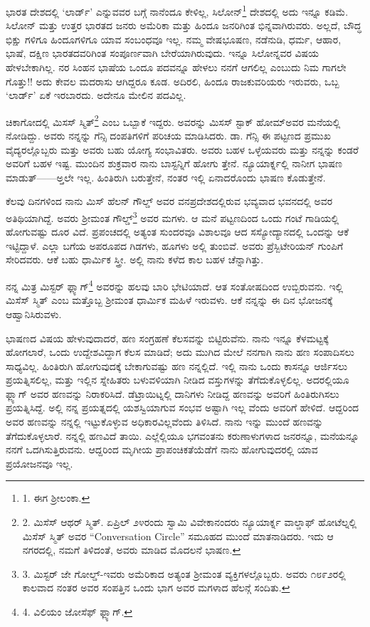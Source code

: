 ಭಾರತ ದೇಶದಲ್ಲಿ ‘ಲಾರ್ಡ್’ ಎನ್ನುವವರ ಬಗ್ಗೆ ನಾನೆಂದೂ ಕೇಳಿಲ್ಲ, ಸಿಲೋನ್\footnote{1. ಈಗ ಶ‍್ರೀಲಂಕಾ.} ದೇಶದಲ್ಲಿ ಅದು ಇನ್ನೂ ಕಡಿಮೆ. ಸಿಲೋನ್ ಮತ್ತು ಉತ್ತರ ಭಾರತದ ಜನರು ಅಮೆರಿಕಾ ಮತ್ತು ಹಿಂದೂ ಜನರಿಗಿಂತ ಭಿನ್ನವಾಗಿರುವರು. ಅಲ್ಲದೆ, ಬೌದ್ಧ ಭಿಕ್ಷು ಗಳಿಗೂ ಹಿಂದೂಗಳಿಗೂ ಯಾವ ಸಂಬಂಧವೂ ಇಲ್ಲ. ನಮ್ಮ ವೇಷಭೂಷಣ, ನಡೆನುಡಿ, ಧರ್ಮ, ಆಹಾರ, ಭಾಷೆ, ದಕ್ಷಿಣ ಭಾರತದವರಿಗಿಂತ ಸಂಪೂರ್ಣವಾಗಿ ಬೇರೆಯಾಗಿರುವುದು. ಇನ್ನೂ ಸಿಲೋನ್ನವರ ವಿಷಯ ಹೇಳಬೇಕಾಗಿಲ್ಲ. ನರ ಸಿಂಹನ ಭಾಷೆಯ ಒಂದೂ ಪದವನ್ನೂ ಹೇಳಲು ನನಗೆ ಆಗಲಿಲ್ಲ ಎಂಬುದು ನಿಮ ಗಾಗಲೇ ಗೊತ್ತು!! ಅದು ಕೇವಲ ಮದರಾಸು ಆಗಿದ್ದರೂ ಕೂಡ. ಅದಿರಲಿ, ಹಿಂದೂ ರಾಜಕುವರಿಯರು ಇರುವರು, ಒಬ್ಬ ‘ಲಾರ್ಡ್’ ಏಕೆ ಇರಬಾರದು. ಅದೇನೂ ಮೇಲಿನ ಪದವಿಲ್ಲ.

ಚಿಕಾಗೋದಲ್ಲಿ ಮಿಸಸ್ ಸ್ಮಿತ್\footnote{2. ಮಿಸೆಸ್ ಆಥರ್ ಸ್ಮಿತ್. ಏಪ್ರಿಲ್ ೨೪ರಂದು ಸ್ವಾಮಿ ವಿವೇಕಾನಂದರು ನ್ಯೂಯಾರ್ಕ್ನ ವಾಲ್ಡಾಫ್ ಹೋಟೆಲ್ನಲ್ಲಿ ಮಿಸೆಸ್ ಸ್ಮಿತ್ ಅವರ “Conversation Circle” ಸಮೂಹದ ಮುಂದೆ ಮಾತನಾಡಿದರು. ಇದು ಆ ನಗರದಲ್ಲಿ, ನಮಗೆ ತಿಳಿದಂತೆ, ಅವರು ಮಾಡಿದ ಮೊದಲನೆ ಭಾಷಣ.} ಎಂಬ ಒಬ್ಬಾಕೆ ಇದ್ದರು. ಅವರನ್ನು ಮಿಸಸ್ ಸ್ಟಾಕ್ ಹೋಮ್​ ಅವರ ಮನೆಯಲ್ಲಿ ನೋಡಿದ್ದು. ಅವರು ನನ್ನನ್ನು ಗೆನ್ಸಿ ದಂಪತಿಗಳಿಗೆ ಪರಿಚಯ ಮಾಡಿಸಿದರು. ಡಾ. ಗೆನ್ಸಿ ಈ ಪಟ್ಟಣದ ಪ್ರಮುಖ ವೈದ್ಯರಲ್ಲೊಬ್ಬರು ಮತ್ತು ಅವರು ಬಹು ಯೋಗ್ಯ ಸಂಭಾವಿತರು. ಅವರು ಬಹಳ ಒಳ್ಳೆಯವರು ಮತ್ತು ನನ್ನನ್ನು ಕಂಡರೆ ಅವರಿಗೆ ಬಹಳ ಇಷ್ಟ. ಮುಂದಿನ ಶುಕ್ರವಾರ ನಾನು ಬಾಸ್ಟನ್ನಿಗೆ ಹೋಗು ತ್ತೇನೆ. ನ್ಯೂಯಾರ್ಕ್ನಲ್ಲಿ ನಾನೀಗ ಭಾಷಣ ಮಾಡುತ್------ಅ್ತಲೇ ಇಲ್ಲ. ಹಿಂತಿರುಗಿ ಬರುತ್ತೇನೆ, ನಂತರ ಇಲ್ಲಿ ಏನಾದರೊಂದು ಭಾಷಣ ಕೊಡುತ್ತೇನೆ.

ಕೆಲವು ದಿನಗಳಿಂದ ನಾನು ಮಿಸ್ ಹೆಲನ್ ಗೌಲ್ಡ್ ಅವರ ವನಪ್ರದೇಶದಲ್ಲಿರುವ ಭವ್ಯವಾದ ಭವನದಲ್ಲಿ ಅವರ ಅತಿಥಿಯಾಗಿದ್ದೆ. ಅವರು ಶ‍್ರೀಮಂತ ಗೌಲ್ಡ್\footnote{3. ಮಿಸ್ಟರ್ ಜೇ ಗೋಲ್ಡ್-ಇವರು ಅಮೆರಿಕಾದ ಅತ್ಯಂತ ಶ‍್ರೀಮಂತ ವ್ಯಕ್ತಿಗಳಲ್ಲೊಬ್ಬರು. ಅವರು ೧೮೯೨ರಲ್ಲಿ ಕಾಲವಾದ ನಂತರ ಅವರ ಸಂಪತ್ತಿನ ಒಂದು ಭಾಗ ಅವರ ಮಗಳಾದ ಹೆಲನ್ಗೆ ಸಂದಿತು.} ಅವರ ಮಗಳು. ಆ ಮನೆ ಪಟ್ಟಣದಿಂದ ಒಂದು ಗಂಟೆ ಗಾಡಿಯಲ್ಲಿ ಹೋಗುವಷ್ಟು ದೂರ ವಿದೆ. ಪ್ರಪಂಚದಲ್ಲಿ ಅತ್ಯಂತ ಸುಂದರವೂ ವಿಶಾಲವೂ ಆದ ಸಸ್ಯೋದ್ಯಾನದಲ್ಲಿ ಒಂದನ್ನು ಆಕೆ ಇಟ್ಟಿದ್ದಾಳೆ. ಎಲ್ಲಾ ಬಗೆಯ ಅಪರೂಪದ ಗಿಡಗಳು, ಹೂಗಳು ಅಲ್ಲಿ ತುಂಬಿವೆ. ಅವರು ಪ್ರೆಸ್ಬಿಟೇರಿಯನ್ ಗುಂಪಿಗೆ ಸೇರಿದವರು. ಆಕೆ ಬಹು ಧಾರ್ಮಿಕ ಸ್ತ್ರೀ. ಅಲ್ಲಿ ನಾನು ಕಳೆದ ಕಾಲ ಬಹಳ ಚೆನ್ನಾಗಿತ್ತು.

ನನ್ನ ಮಿತ್ರ ಮಿಸ್ಟರ್ ಫ್ಲ್ಯಾಗ್\footnote{4. ವಿಲಿಯಂ ಜೋಸೆಫ್ ಫ್ಲ್ಯಾಗ್.} ಅವರನ್ನು ಹಲವು ಬಾರಿ ಭೇಟಿಯಾದೆ. ಆತ ಸಂತೋಷದಿಂದ ಉಬ್ಬಿರುವನು. ಇಲ್ಲಿ ಮಿಸೆಸ್ ಸ್ಮಿತ್ ಎಂಬ ಮತ್ತೊಬ್ಬ ಶ‍್ರೀಮಂತ ಧಾರ್ಮಿಕ ಮಹಿಳೆ ಇರುವಳು. ಆಕೆ ನನ್ನನ್ನು ಈ ದಿನ ಭೋಜನಕ್ಕೆ ಆಹ್ವಾನಿಸಿರುವಳು.

ಭಾಷಣದ ವಿಷಯ ಹೇಳುವುದಾದರೆ, ಹಣ ಸಂಗ್ರಹಣೆ ಕೆಲಸವನ್ನು ಬಿಟ್ಟಿರುವೆನು. ನಾನು ಇನ್ನೂ ಕೆಳಮಟ್ಟಕ್ಕೆ ಹೋಗಲಾರೆ, ಒಂದು ಉದ್ದೇಶವಿದ್ದಾಗ ಕೆಲಸ ಮಾಡಿದೆ; ಅದು ಮುಗಿದ ಮೇಲೆ ನನಗಾಗಿ ನಾನು ಹಣ ಸಂಪಾದಿಸಲು ಸಾಧ್ಯವಿಲ್ಲ. ಹಿಂತಿರುಗಿ ಹೋಗುವುದಕ್ಕೆ ಬೇಕಾಗುವಷ್ಟು ಹಣ ನನ್ನಲ್ಲಿದೆ. ಇಲ್ಲಿ ನಾನು ಒಂದು ಕಾಸನ್ನೂ ಆರ್ಜಿಸಲು ಪ್ರಯತ್ನಿಸಲಿಲ್ಲ, ಮತ್ತು ಇಲ್ಲಿನ ಸ್ನೇಹಿತರು ಬಳುವಳಿಯಾಗಿ ನೀಡಿದ ವಸ್ತುಗಳನ್ನು ತೆಗೆದುಕೊಳ್ಳಲಿಲ್ಲ. ಅದರಲ್ಲಿಯೂ ಫ್ಲ್ಯಾಗ್ ಅವರ ಹಣವನ್ನು ನಿರಾಕರಿಸಿದೆ. ಡೆಟ್ರಾಯಿಟ್ನಲ್ಲಿ ದಾನಿಗಳು ನೀಡಿದ್ದ ಹಣವನ್ನು ಅವರಿಗೆ ಹಿಂತಿರುಗಿಸಲು ಪ್ರಯತ್ನಿಸಿದ್ದೆ. ಅಲ್ಲಿ ನನ್ನ ಪ್ರಯತ್ನದಲ್ಲಿ ಯಶಸ್ವಿಯಾಗುವ ಸಂಭವ ಅಷ್ಟಾಗಿ ಇಲ್ಲ ವೆಂದು ಅವರಿಗೆ ಹೇಳಿದೆ. ಆದ್ದರಿಂದ ಅವರ ಹಣವನ್ನು ನನ್ನಲ್ಲಿ ಇಟ್ಟುಕೊಳ್ಳುವ ಅಧಿಕಾರವಿಲ್ಲವೆಂದು ತಿಳಿಸಿದೆ. ನಾನು ಇನ್ನು ಮುಂದೆ ಹಣವನ್ನು ತೆಗೆದುಕೊಳ್ಳಲಾರೆ. ನನ್ನಲ್ಲಿ ಹಣವಿದೆ ತಾಯಿ. ಎಲ್ಲೆಲ್ಲಿಯೂ ಭಗವಂತನು ಕರುಣಾಳುಗಳಾದ ಜನರನ್ನೂ, ಮನೆಯನ್ನೂ ನನಗೆ ಒದಗಿಸುತ್ತಿರುವನು. ಆದ್ದರಿಂದ ಮೃಗೀಯ ಪ್ರಾಪಂಚಿಕತೆಯೆಡೆಗೆ ನಾನು ಹೋಗುವುದರಲ್ಲಿ ಯಾವ ಪ್ರಯೋಜನವೂ ಇಲ್ಲ.

